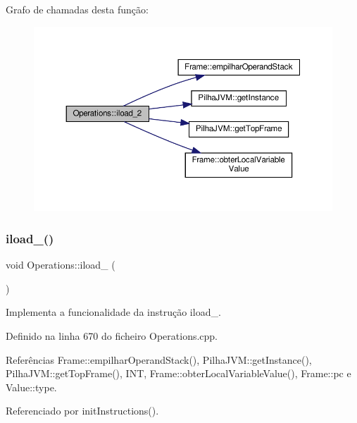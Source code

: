 Grafo de chamadas desta função\+:
\nopagebreak
\begin{figure}[H]
\begin{center}
\leavevmode
\includegraphics[width=350pt]{classOperations_affa5afeadb98117ea0ee66cf2687eb0a_cgraph}
\end{center}
\end{figure}
\mbox{\label{classOperations_a3f645534291129289ee71c708dbe633c}} 
\subsubsection{\texorpdfstring{iload\+\_()}{iload\_3()}}
{\footnotesize\ttfamily void Operations\+::iload\+\_ (\begin{DoxyParamCaption}{ }\end{DoxyParamCaption})\hspace{0.3cm}{\ttfamily [private]}}



Implementa a funcionalidade da instrução iload\+\_. 



Definido na linha 670 do ficheiro Operations.\+cpp.



Referências Frame\+::empilhar\+Operand\+Stack(), Pilha\+J\+V\+M\+::get\+Instance(), Pilha\+J\+V\+M\+::get\+Top\+Frame(), I\+NT, Frame\+::obter\+Local\+Variable\+Value(), Frame\+::pc e Value\+::type.



Referenciado por init\+Instructions().

